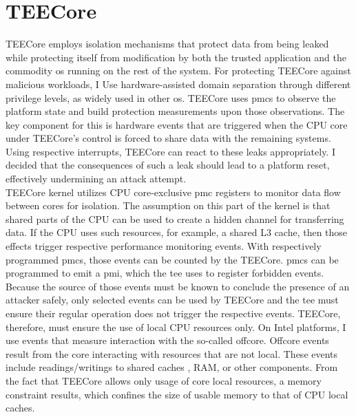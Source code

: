 \section{TEECore}
\label{sec:30:tee_kernel}
TEECore employs isolation mechanisms that protect data from being leaked while
protecting itself from modification by both the trusted application and the
commodity \gls{os} running on the rest of the system. For protecting TEECore
against malicious workloads, I Use hardware-assisted domain separation through
different privilege levels, as widely used in other \gls{os}. TEECore uses
\glspl{pmc} to observe the platform state and build protection measurements upon
those observations. The key component for this is hardware events that are
triggered when the CPU core under TEECore's control is forced to share data with
the remaining systems. Using respective interrupts, TEECore can react to these
leaks appropriately. I decided that the consequences of such a leak should lead
to a platform reset, effectively undermining an attack attempt.\\

TEECore kernel utilizes CPU core-exclusive \gls{pmc} registers to monitor data
flow between cores for isolation. The assumption on this part of the kernel is
that shared parts of the CPU can be used to create a hidden channel for
transferring data. If the CPU uses such resources, for example, a shared L3
cache, then those effects trigger respective performance monitoring events. With
respectively programmed \glspl{pmc}, those events can be counted by the TEECore.
\glspl{pmc} can be programmed to emit a \gls{pmi}, which the \gls{tee} uses to
register forbidden events. Because the source of those events must be known to
conclude the presence of an attacker safely, only selected events can be used by
TEECore and the \gls{tee} must ensure their regular operation does not trigger
the respective events. TEECore, therefore, must ensure the use of local CPU
resources only. On Intel platforms, I use events that measure interaction with
the so-called offcore. Offcore events result from the core interacting with
resources that are not local. These events include readings/writings to shared
caches , RAM, or other components. From the fact that TEECore allows only usage
of core local resources, a memory constraint results, which confines the size of
usable memory to that of CPU local caches.\\

